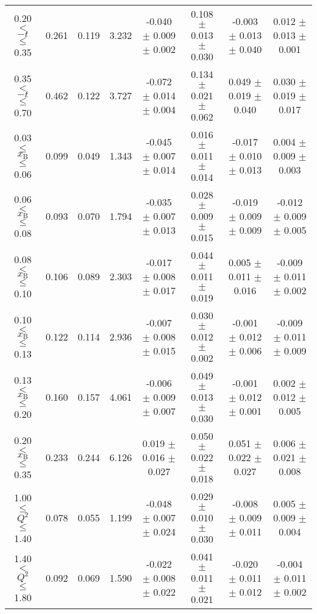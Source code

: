 \begin{table}[width=15cm]
\begin{center}
{\begin{tabular}{|c|c|c|c|c|c|c|c|}
0.20 $<$ $-t$ $\leqslant$ 0.35 &   0.261 & 0.119 &  3.232 &  -0.040 $\pm$   0.009  $\pm$  0.002 &
0.108 $\pm$  0.013  $\pm$ 0.030 & -0.003 $\pm$   0.013  $\pm$  0.040 & 0.012  $\pm$   0.013   $\pm$   0.001\\
0.35 $<$ $-t$ $\leqslant$ 0.70 &  0.462 & 0.122 &  3.727 &  -0.072  $\pm$  0.014  $\pm$   0.004 & 
0.134 $\pm$  0.021  $\pm$   0.062 & 0.049 $\pm$   0.019  $\pm$  0.040 & 0.030   $\pm$  0.019   $\pm$ 0.017\\
\hline
0.03 $\leqslant$ $x_{\textrm{B}}$ $\leqslant$ 0.06 &  0.099 &  0.049 &   1.343 &  -0.045  $\pm$  0.007  $\pm$   0.014 & 
0.016  $\pm$  0.011  $\pm$   0.014 & -0.017 $\pm$  0.010 $\pm$  0.013 &  0.004   $\pm$  0.009  $\pm$    0.003\\
0.06 $<$ $x_{\textrm{B}}$ $\leqslant$ 0.08 & 0.093  & 0.070 & 1.794  &   -0.035  $\pm$  0.007  $\pm$   0.013 &
0.028  $\pm$  0.009  $\pm$   0.015 & -0.019  $\pm$ 0.009  $\pm$  0.009 & -0.012   $\pm$  0.009   $\pm$   0.005\\
0.08 $<$ $x_{\textrm{B}}$ $\leqslant$ 0.10 &  0.106 & 0.089 &  2.303 &  -0.017  $\pm$  0.008  $\pm$   0.017 & 
0.044  $\pm$  0.011  $\pm$   0.019 & 0.005 $\pm$  0.011 $\pm$    0.016 & -0.009   $\pm$  0.011    $\pm$  0.002\\
0.10 $<$ $x_{\textrm{B}}$ $\leqslant$ 0.13 &  0.122 & 0.114  & 2.936  &  -0.007  $\pm$  0.008  $\pm$   0.015 & 
0.030  $\pm$  0.012 $\pm$   0.002 & -0.001 $\pm$  0.012  $\pm$   0.006 & -0.009   $\pm$  0.011  $\pm$    0.009\\
0.13 $<$ $x_{\textrm{B}}$ $\leqslant$ 0.20 &  0.160 & 0.157 & 4.061 &   -0.006   $\pm$ 0.009  $\pm$   0.007 & 
0.049  $\pm$  0.013 $\pm$    0.030 & -0.001  $\pm$  0.012  $\pm$   0.001 & 0.002   $\pm$  0.012   $\pm$  0.005\\
0.20 $<$ $x_{\textrm{B}}$ $\leqslant$ 0.35 & 0.233  & 0.244 &  6.126 &  0.019 $\pm$  0.016   $\pm$  0.027 & 
0.050  $\pm$  0.022   $\pm$  0.018 & 0.051  $\pm$  0.022  $\pm$   0.027 & 0.006  $\pm$   0.021  $\pm$   0.008\\
\hline
1.00 $\leqslant$ $Q^{2}$ $\leqslant$ 1.40 &  0.078 &  0.055 & 1.199 &  -0.048  $\pm$  0.007  $\pm$   0.024 & 
0.029  $\pm$  0.010  $\pm$   0.030 &  -0.008 $\pm$  0.009  $\pm$  0.011 & 0.005  $\pm$  0.009   $\pm$   0.004\\
1.40 $<$ $Q^{2}$ $\leqslant$ 1.80 & 0.092  & 0.069 &  1.590 &  -0.022  $\pm$  0.008  $\pm$   0.022 & 
0.041  $\pm$  0.011  $\pm$   0.021 & -0.020  $\pm$  0.011  $\pm$  0.012 & -0.004  $\pm$  0.011   $\pm$  0.002\\

\end{tabular}}
\end{center}
\end{table}
